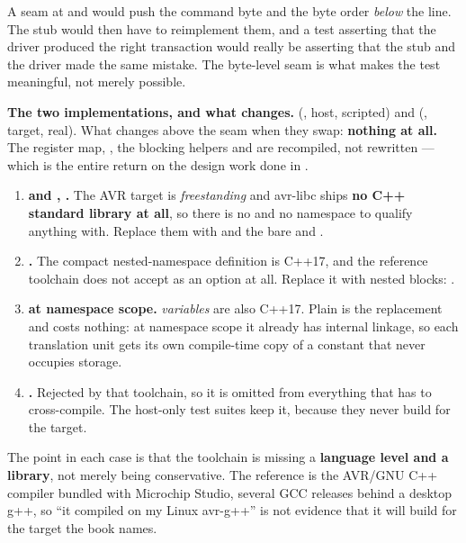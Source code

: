 A seam at  and  would push the command byte and the byte order
\emph{below} the line. The stub would then have to reimplement them, and a test asserting that the
driver produced the right transaction would really be asserting that the stub and the driver made
the same mistake. The byte-level seam is what makes the test meaningful, not merely possible.

\textbf{The two implementations, and what changes.}  (,
host, scripted) and  (, target, real). What changes above
the seam when they swap: \textbf{nothing at all.} The register map, , the blocking helpers
and  are recompiled, not rewritten --- which is the entire return on the design work
done in . 

\begin{enumerate}
  \item \textbf{ and , .} The AVR
    target is \emph{freestanding} and avr-libc ships \textbf{no C++ standard library at all}, so
    there is no  and no  namespace to qualify anything with. Replace them
    with  and the bare  and .
  \item \textbf{.} The compact nested-namespace definition is
    C++17, and the reference toolchain does not accept  as an option at all.
    Replace it with nested blocks: .
  \item \textbf{ at namespace scope.}  \emph{variables} are also
    C++17. Plain  is the replacement and costs nothing: at namespace scope it already
    has internal linkage, so each translation unit gets its own compile-time copy of a constant that
    never occupies storage.
  \item \textbf{\code{[[nodiscard]]}.} Rejected by that toolchain, so it is omitted from everything
    that has to cross-compile. The host-only test suites keep it, because they never build for the
    target.
\end{enumerate}

The point in each case is that the toolchain is missing a \textbf{language level and a library}, not
merely being conservative. The reference is the AVR/GNU C++ compiler bundled with Microchip Studio,
several GCC releases behind a desktop g++, so ``it compiled on my Linux avr-g++'' is not evidence
that it will build for the target the book names.

